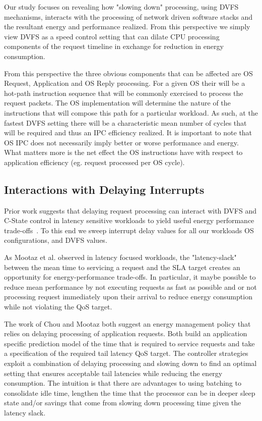 Our study focuses on revealing how "slowing down" processing, using DVFS mechanisms, interacts with the processing of network driven software stacks and the resultant energy and performance realized. From this perspective we simply view DVFS as a speed control setting that can dilate CPU processing components of the request timeline in exchange for reduction in energy consumption.

From this perspective the three obvious components that can be affected are OS Request, Application and OS Reply processing. For a given OS their will be a hot-path instruction sequence that will be commonly exercised to process the request packets.  The OS implementation will determine the nature of the instructions that will compose this path for a particular workload.  As such, at the fastest DVFS setting there will be a characteristic mean number of cycles that will be required and thus an IPC efficiency realized.  It is important to note that OS IPC does not necessarily imply better or worse performance and energy. What matters more is the net effect the OS instructions have with respect to application efficiency (eg. request processed per OS cycle). %








\subsection{Interactions with Delaying Interrupts}

Prior work suggests that delaying request processing can interact with DVFS and C-State control in latency sensitive workloads to yield useful energy performance trade-offs~\cite{mootaz, udpm}. To this end we sweep interrupt delay values for all our workloads OS configurations, and DVFS values.

As Mootaz et al.\cite{mootaz} observed in latency focused workloads, the "latency-slack" between the mean time to servicing a request and the SLA target creates an opportunity for energy-performance trade-offs.  In particular, it maybe possible to reduce mean performance by not executing requests as fast as possible and or not processing request immediately upon their arrival to reduce energy consumption while not violating the QoS target.  

The work of Chou and Mootaz both suggest an energy management policy that relies on delaying processing of application requests. Both build an application specific prediction model of the time that is required to service requests and take a specification of the required tail latency QoS target. The  controller strategies exploit a combination of delaying processing and slowing down to find an optimal setting that ensures acceptable tail latencies while reducing the energy consumption.  The intuition is that there are advantages to using batching to consolidate idle time, lengthen the time that the processor can be in deeper sleep state and/or savings that come from slowing down processing time given the latency slack.    

